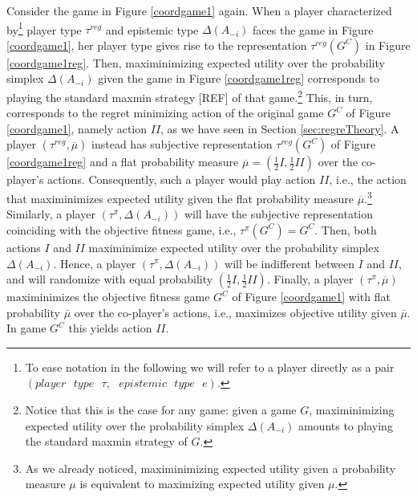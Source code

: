 \documentclass[fleqn,reqno,11pt]{article}
\begin{document}
\begin{example}
  Consider the game in Figure \ref{coordgame1} again. When a player characterized
  by\footnote{To ease notation in the following we will refer to a player directly as a pair
    $(player \text{ } type \text{ } \tau,\text{ } epistemic\text{ } type \text{ } e)$.} player
  type $ \tau^{reg} $ and epistemic type $ \Delta(A_{-i}) $ faces the game in Figure
  \ref{coordgame1}, her player type gives rise to the representation $\tau^{reg}(G^C)$ in
  Figure \ref{coordgame1reg}. Then, maximinimizing expected utility over the probability
  simplex $ \Delta(A_{-i}) $ given the game in Figure \ref{coordgame1reg} corresponds to
  playing the standard maxmin strategy [REF] of that game.\footnote{Notice that this is the
    case for any game: given a game $G$, maximinimizing expected utility over the probability
    simplex $ \Delta(A_{-i}) $ amounts to playing the standard maxmin strategy of $G$.} This,
  in turn, corresponds to the regret minimizing action of the original game $G^C$ of Figure
  \ref{coordgame1}, namely action $II$, as we have seen in Section \ref{sec:regreTheory}. A
  player $(\tau^{reg},\overline{\mu})$ instead has subjective representation $\tau^{reg}(G^C)$
  of Figure \ref{coordgame1reg} and a flat probability measure
  $\overline{\mu}=(\frac{1}{2}I,\frac{1}{2}II)$ over the co-player's actions. Consequently,
  such a player would play action $II$, i.e., the action that maximinimizes expected utility
  given the flat probability measure $\overline{\mu}$.\footnote{As we already noticed,
    maximinimizing expected utility given a probability measure $\mu$ is equivalent to
    maximizing expected utility given $\mu$.}  Similarly, a player
  $(\tau^{\pi},\Delta(A_{-i}))$ will have the subjective representation coinciding with the
  objective fitness game, i.e., $ \tau^{\pi}(G^C)= G^C $. Then, both actions $I$ and $II$
  maximinimize expected utility over the probability simplex $ \Delta(A_{-i}) $. Hence, a
  player $(\tau^{\pi},\Delta(A_{-i}))$ will be indifferent between $I$ and $II$, and will
  randomize with equal probability $(\frac{1}{2}I,\frac{1}{2}II)$. Finally, a player
  $(\tau^{\pi},\overline{\mu})$ maximinimizes the objective fitness game $G^C$ of Figure
  \ref{coordgame1} with flat probability $\overline{\mu}$ over the co-player's actions, i.e.,
  maximizes objective utility given $\overline{\mu}$. In game $G^C$ this yields action $II$.





\end{example}
\end{document}
